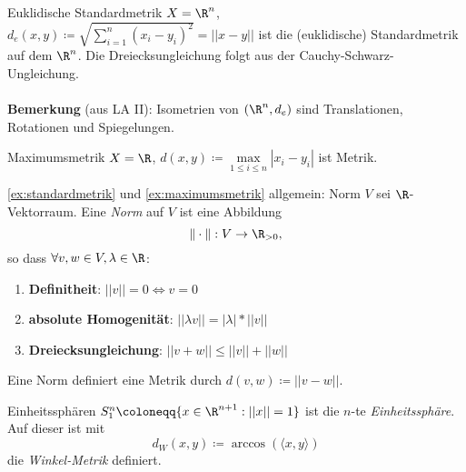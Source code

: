 \begin{example}{Euklidische Standardmetrik}
  \label{ex:standardmetrik}
  $ X = \R^n $, $ d_e(x, y) \coloneqq \sqrt{\sum_{i=1}^n(x_i-y_i)^2} = ||x-y|| $ ist die (euklidische) Standardmetrik auf dem $ \R^n $. Die Dreiecksungleichung folgt aus der Cauchy-Schwarz-Ungleichung. \\ \ \\
  \textbf{Bemerkung} (aus LA II): Isometrien von $ (\R^n, d_e) $ sind Translationen, Rotationen und Spiegelungen.
\end{example}

\clearpage

\begin{example}{Maximumsmetrik}
  \label{ex:maximumsmetrik}
  $ X = \R $, $ d(x, y) \coloneqq \underset{1 \leq i \leq n}{\max} |x_i-y_i| $ ist Metrik.
\end{example}

\begin{example}{\autoref{ex:standardmetrik} und \autoref{ex:maximumsmetrik} allgemein: Norm}
  $ V $ sei $ \R $-Vektorraum. Eine \emph{Norm} auf $ V $ ist eine Abbildung 
  \begin{equation*}
    \Vert\cdot\Vert : V \to \R_{>0}\text{,}
  \end{equation*}
  so dass $ \forall v, w \in V, \lambda \in \R $:
  \begin{enumerate}
    \item \textbf{Definitheit}: $ ||v|| = 0 \Leftrightarrow v = 0 $
    \item \textbf{absolute Homogenität}: $ ||\lambda v|| = |\lambda| * ||v|| $
    \item \textbf{Dreiecksungleichung}: $ ||v+w|| \leq ||v||+||w|| $
  \end{enumerate}
  Eine Norm definiert eine Metrik durch $ d(v, w) \coloneqq ||v-w|| $.
\end{example}

\begin{example}{Einheitssphären}
  $ S_1^n \coloneqq \{ x \in \R^{n+1} : ||x|| = 1 \} $  ist die $ n $-te \emph{Einheitssphäre}. \\
  Auf dieser ist mit
  \begin{equation*}
     d_W(x, y) \coloneqq \arccos(\langle x, y \rangle)
  \end{equation*}
  die \emph{Winkel-Metrik} definiert.
\end{example}

